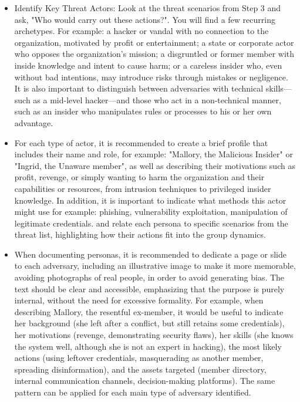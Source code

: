 \begin{itemize}
    \item Identify Key Threat Actors: Look at the threat scenarios from Step 3 and ask, "Who would
    carry out these actions?". You will find a few recurring archetypes. For example:
    a hacker or vandal with no connection to the organization, motivated by profit or
    entertainment; a state or corporate actor who opposes the organization's
    mission; a disgruntled or former member with inside knowledge and intent to
    cause harm; or a careless insider who, even without bad intentions, may
    introduce risks through mistakes or negligence. It is also important to
    distinguish between adversaries with technical skills—such as a mid-level
    hacker—and those who act in a non-technical manner, such as an insider who
    manipulates rules or processes to his or her own advantage.

    \item For each type of actor, it is recommended to create a brief profile that
    includes their name and role, for example: "Mallory, the Malicious Insider" or "Ingrid,
    the Unaware member", as well as describing their motivations such as profit,
    revenge, or simply wanting to harm the organization and their capabilities or
    resources, from intrusion techniques to privileged insider knowledge. In
    addition, it is important to indicate what methods this actor might use for example:
    phishing, vulnerability exploitation, manipulation of legitimate credentials.
    and relate each persona to specific scenarios from the threat list, highlighting
    how their actions fit into the group dynamics.

    \item When documenting personas, it is recommended to dedicate a page or slide to each
    adversary, including an illustrative image to make it more memorable, avoiding
    photographs of real people, in order to avoid generating bias.
    The text should be clear and accessible, emphasizing that the purpose is
    purely internal, without the need for excessive formality. For example, when
    describing Mallory, the resentful ex-member, it would be useful to indicate her
    background (she left after a conflict, but still retains some credentials), her
    motivations (revenge, demonstrating security flaws), her skills (she knows the
    system well, although she is not an expert in hacking), the most likely actions
    (using leftover credentials, masquerading as another member, spreading
    disinformation), and the assets targeted (member directory, internal
    communication channels, decision-making platforms). The same pattern can be
    applied for each main type of adversary identified.
    

\end{itemize}
